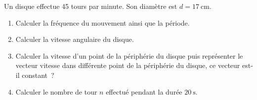 
Un disque effectue 45 tours par minute. Son diamètre est $d=\qty{17}{\cm}$.
\begin{enumerate}
    \item Calculer la fréquence du mouvement ainsi que la période.
    \item Calculer la vitesse angulaire du disque.
    \item Calculer la vitesse d'un point de la périphérie du disque puis
          représenter le vecteur vitesse dans différente point de la périphérie
          du disque, ce vecteur est-il constant~?
    \item Calculer le nombre de tour $n$ effectué pendant la durée
          $\qty{20}{\second}$. 
\end{enumerate}
